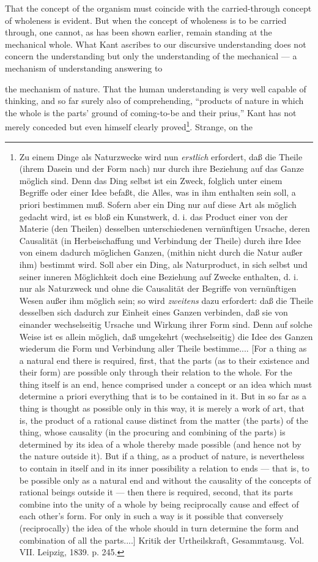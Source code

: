 \documentclass[12pt,a4paper]{book}
\begin{document}
That the concept of the organism must coincide with the carried-through concept
of wholeness is evident. But when the concept of wholeness is to be carried
through, one cannot, as has been shown earlier, remain standing at the
mechanical whole. What Kant ascribes to our discursive understanding does not
concern the understanding but only the understanding of the mechanical --- a
mechanism of understanding answering to

\setcounter{footnote}{0}
the mechanism of nature. That the human understanding is very well capable of
thinking, and so far surely also of comprehending, ``products of nature in which
the whole is the parts' ground of coming-to-be and their prius,'' Kant has not
merely conceded but even himself clearly proved\footnote{Zu einem Dinge als
Naturzwecke wird nun \emph{erstlich} erfordert, daß die Theile (ihrem Dasein und
der Form nach) nur durch ihre Beziehung auf das Ganze möglich sind. Denn das
Ding selbst ist ein Zweck, folglich unter einem Begriffe oder einer Idee befaßt,
die Alles, was in ihm enthalten sein soll, a priori bestimmen muß. Sofern aber
ein Ding nur auf diese Art als möglich gedacht wird, ist es bloß ein Kunstwerk,
d. i. das Product einer von der Materie (den Theilen) desselben unterschiedenen
vernünftigen Ursache, deren Causalität (in Herbeischaffung und Verbindung der
Theile) durch ihre Idee von einem dadurch möglichen Ganzen, (mithin nicht durch
die Natur außer ihm) bestimmt wird. Soll aber ein Ding, als Naturproduct, in
sich selbst und seiner inneren Möglichkeit doch eine Beziehung auf Zwecke
enthalten, d. i. nur als Naturzweck und ohne die Causalität der Begriffe von
vernünftigen Wesen außer ihm möglich sein; so wird \emph{zweitens} dazu
erfordert: daß die Theile desselben sich dadurch zur Einheit eines Ganzen
verbinden, daß sie von einander wechselseitig Ursache und Wirkung ihrer Form
sind. Denn auf solche Weise ist es allein möglich, daß umgekehrt (wechselseitig)
die Idee des Ganzen wiederum die Form und Verbindung aller Theile bestimme....
[For a thing as a natural end there is required, first, that the parts
(as to their existence and their form) are possible only through their relation
to the whole. For the thing itself is an end, hence comprised under a concept or
an idea which must determine a priori everything that is to be contained in it.
But in so far as a thing is thought as possible only in this way, it is merely a
work of art, that is, the product of a rational cause distinct from the matter
(the parts) of the thing, whose causality (in the procuring and combining of the
parts) is determined by its idea of a whole thereby made possible (and hence not
by the nature outside it). But if a thing, as a product of nature, is
nevertheless to contain in itself and in its inner possibility a relation to
ends --- that is, to be possible only as a natural end and without the causality
of the concepts of rational beings outside it --- then there is required,
second, that its parts combine into the unity of a whole by being
reciprocally cause and effect of each other's form. For only in such a way is it
possible that conversely (reciprocally) the idea of the whole should in turn
determine the form and combination of all the parts....] Kritik der
Urtheilskraft, Gesammtausg. Vol. VII. Leipzig, 1839. p. 245.}. Strange, on the
\end{document}
